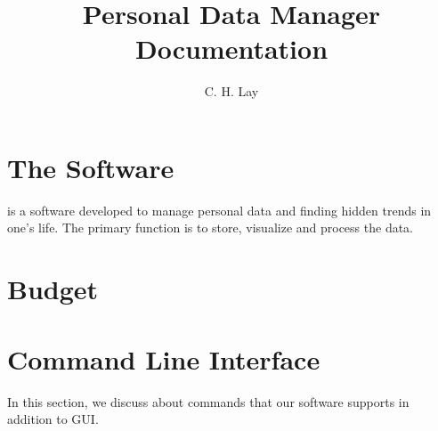\documentclass{article}
\title{Personal Data Manager\\ \Large{Documentation}}
\author{C. H. Lay}
\begin{document}
\maketitle
\tableofcontents

\section{The Software}
 is a software developed to manage personal data and finding hidden trends in one's life. The primary function is to store, visualize and process the data.

\section{Budget}

\section{Command Line Interface}
In this section, we discuss about commands that our software supports in addition to GUI.
\end{document}
